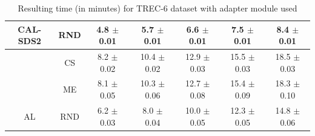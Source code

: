 \begin{table}[htbp]
\begin{tabular*}{\linewidth}{c|c|@{\extracolsep{\fill}}ccccc}
\multirow{-3}{*}{\raggedright\arraybackslash CAL-SDS2} & RND & 4.8 $\pm$ {\small 0.01} & 5.7 $\pm$ {\small 0.01} & 6.6 $\pm$ {\small 0.01} & 7.5 $\pm$ {\small 0.01} & 8.4 $\pm$ {\small 0.01}\\
\midrule
 & CS & 8.2 $\pm$ {\small 0.02} & 10.4 $\pm$ {\small 0.02} & 12.9 $\pm$ {\small 0.03} & 15.5 $\pm$ {\small 0.03} & 18.5 $\pm$ {\small 0.03}\\

 & ME & 8.1 $\pm$ {\small 0.05} & 10.3 $\pm$ {\small 0.06} & 12.7 $\pm$ {\small 0.08} & 15.4 $\pm$ {\small 0.09} & 18.3 $\pm$ {\small 0.10}\\

\multirow{-3}{*}{\raggedright\arraybackslash AL} & RND & 6.2 $\pm$ {\small 0.03} & 8.0 $\pm$ {\small 0.04} & 10.0 $\pm$ {\small 0.05} & 12.3 $\pm$ {\small 0.05} & 14.8 $\pm$ {\small 0.06}\\
\bottomrule
\end{tabular*}
\caption{Resulting time (in minutes) for TREC-6 dataset with adapter module used}
\label{tab:time_full_trec_10_adapter}
\end{table}

